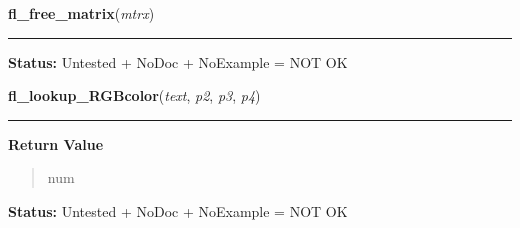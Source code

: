     \vspace{0.5ex}

\hspace{.8\funcindent}\begin{boxedminipage}{\funcwidth}

    \raggedright \textbf{fl\_free\_matrix}(\textit{mtrx})

    \vspace{-1.5ex}

    \rule{\textwidth}{0.5\fboxrule}
\setlength{\parskip}{2ex}
\setlength{\parskip}{1ex}
\textbf{Status:} Untested + NoDoc + NoExample = NOT OK



    \end{boxedminipage}

    \label{xformslib:library:fl_lookup_RGBcolor}

    \vspace{0.5ex}

\hspace{.8\funcindent}\begin{boxedminipage}{\funcwidth}

    \raggedright \textbf{fl\_lookup\_RGBcolor}(\textit{text}, \textit{p2}, \textit{p3}, \textit{p4})

    \vspace{-1.5ex}

    \rule{\textwidth}{0.5\fboxrule}
\setlength{\parskip}{2ex}
\setlength{\parskip}{1ex}
      \textbf{Return Value}
    \vspace{-1ex}

      \begin{quote}
      num

      \end{quote}

\textbf{Status:} Untested + NoDoc + NoExample = NOT OK



    \end{boxedminipage}

    \label{xformslib:library:flimage_add_format}

    \vspace{0.5ex}

